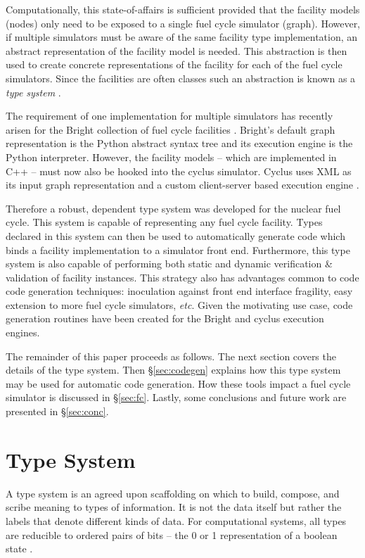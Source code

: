 \documentclass{ansconfpaper}
\begin{document}
Computationally, this state-of-affairs is sufficient provided that the facility 
models (nodes) only need to be exposed to a single fuel cycle simulator (graph).
However, if multiple simulators must be aware of the same facility type 
implementation, an  abstract representation of the facility model is needed.  
This abstraction is then
used to create concrete representations of the facility for each of the fuel cycle
simulators.  Since the facilities are often classes such an abstraction is 
known as a \emph{type system} \cite{Pierce:2002:TPL:509043}.

The requirement of one implementation for multiple simulators has recently
arisen for the Bright collection of fuel cycle facilities \cite{Scopatz2009}.
Bright's default graph representation is the Python abstract syntax tree and its
execution engine is the Python interpreter.  However, the facility models -- 
which are implemented in C++ -- must now also be hooked into the cyclus simulator.  
Cyclus uses XML as its input graph representation and a custom client-server based 
execution engine \cite{cyclus2012}.

Therefore a robust, dependent type system was developed for the nuclear fuel cycle.
This system is capable of representing any fuel cycle facility.  Types declared in 
this system can then be used to automatically generate code which binds a facility 
implementation to a simulator front end.  
Furthermore, this type system is also capable of performing both static and dynamic
verification \& validation of facility instances.
This strategy also has advantages common to code code generation techniques:
inoculation against front end interface fragility, easy 
extension to more fuel cycle simulators, \emph{etc}.
Given the motivating use case, code 
generation routines have been created for the Bright and cyclus execution engines.

The remainder of this paper proceeds as follows.  The next section covers the 
details of the type system.  Then \S \ref{sec:codegen} explains how this type system
may be used for automatic code generation.  How these tools impact a fuel cycle 
simulator is discussed in \S \ref{sec:fc}.  Lastly, some conclusions and future
work are presented in \S \ref{sec:conc}.

\section{Type System}
\label{sec:ts}

A type system is an agreed upon scaffolding on which to build, compose, and scribe 
meaning to types of information.  It is not the data itself but rather the labels
that denote different kinds of data.  For computational systems, all types are 
reducible to ordered pairs of bits -- the 0 or 1 representation of a boolean state
\cite{DBLP:journals/jsyml/Church40}.
\end{document}
